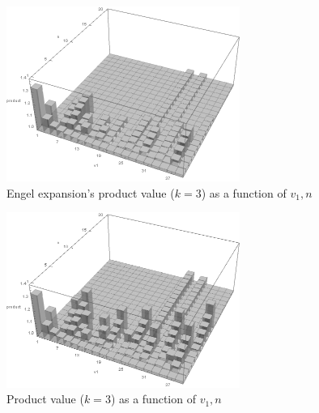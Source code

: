 \documentclass[12pt]{amsart}
\theoremstyle{definition}
\begin{document}
\newpage
\begin{figure}[H]
	\begin{center}
		\includegraphics[width=0.68\textwidth]{prod_engel.png}
		\caption{Engel expansion's product value ($k=3$) as a function of $v_1,n$}
		\label{fig:1}
	\end{center}
\end{figure}

\begin{figure}[H]
	\begin{center}
		\includegraphics[width=0.68\textwidth]{prod.png}
		\caption{Product value ($k=3$) as a function of $v_1,n$}
		\label{fig:2}
	\end{center}
\end{figure}

\vspace{1em}


\end{document}
